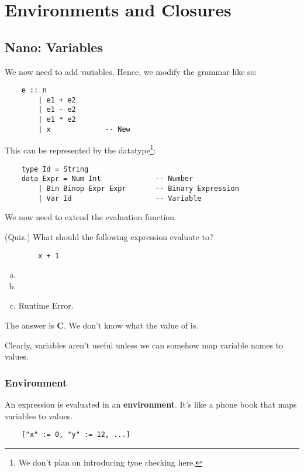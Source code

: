\documentclass[letterpaper]{article}
\begin{document}
\section{Environments and Closures}
\subsection{Nano: Variables}
We now need to add variables. Hence, we modify the grammar like so: 
\begin{verbatim}
    e :: n 
        | e1 + e2 
        | e1 - e2 
        | e1 * e2 
        | x             -- New \end{verbatim}
This can be represented by the datatype\footnote{We don't plan on introducing tyoe checking here.}: 
\begin{verbatim}
    type Id = String 
    data Expr = Num Int             -- Number 
        | Bin Binop Expr Expr       -- Binary Expression
        | Var Id                    -- Variable \end{verbatim}

We now need to extend the evaluation function.

\begin{mdframed}[]
    (Quiz.) What should the following expression evaluate to? 
    \begin{verbatim}
        x + 1\end{verbatim}
    \begin{enumerate}[(a)]
        \item {}
        \item {}
        \item Runtime Error.
    \end{enumerate}

    \begin{mdframed}[]
        The answer is \textbf{C}. We don't know what the value of  is.
    \end{mdframed}
\end{mdframed}
Clearly, variables aren't useful unless we can somehow map variable names to values. 

\subsubsection{Environment}
An expression is evaluated in an \textbf{environment}. It's like a phone book that maps variables to values. 
\begin{verbatim}
    ["x" := 0, "y" := 12, ...]\end{verbatim}
\end{document}
